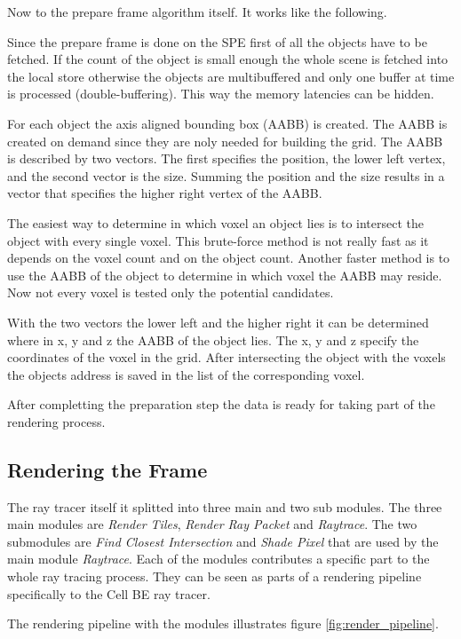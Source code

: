 \documentclass[DIV10, abstracton, openright, footsepline, headsepline, twoside, 9pt,
bigheadings]{scrreprt}
\begin{document}
Now to the prepare frame algorithm itself. It works like the following.

Since the prepare frame is done on the SPE first of all the objects have to be
fetched. If the count of the object is small enough the whole scene is fetched
into the local store otherwise the objects are multibuffered and only one
buffer at time is processed (double-buffering). This way the memory latencies can
be hidden.

For each object the axis aligned bounding box (AABB) is created. The AABB is
created on demand since they are noly needed for building the grid. The AABB is
described by two vectors. The first specifies the position, the lower left vertex,
and the second vector is the size. Summing the position and the size results in
a vector that specifies the higher right vertex of the AABB.


The easiest way to determine in which voxel an object lies is to intersect
the object with every single voxel. This brute-force method is not really fast
as it depends on the voxel count and on the object count. Another faster method
is to use the AABB of the object to determine in which voxel the AABB may
reside. Now not every voxel is tested only the potential candidates.

With the two vectors the lower left and the higher right it can be determined
where in x, y and z the AABB of the object lies. The x, y and z specify the
coordinates of the voxel in the grid. After intersecting the object
with the voxels the objects address is saved in the list of the corresponding
voxel.

After completting the preparation step the data is ready for taking part
of the rendering process.


\subsection{Rendering the Frame}
\label{sec:design_render_frame}


The ray tracer itself it splitted into three main and two sub modules. The three
main modules are \textit{Render Tiles}, \textit{Render Ray Packet} and
\textit{Raytrace}. The two submodules are \textit{Find Closest Intersection} and
\textit{Shade Pixel} that are used by the main module \textit{Raytrace}. Each of
the modules contributes a specific part to the whole ray tracing process. They can
be seen as parts of a rendering pipeline specifically to the Cell BE ray tracer.

The rendering pipeline with the modules illustrates figure \ref{fig:render_pipeline}.
\end{document}
